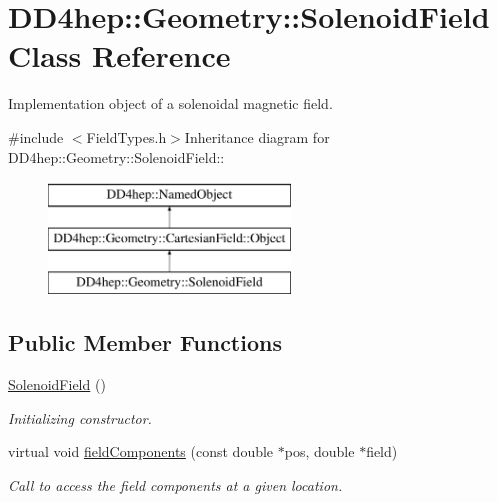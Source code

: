 \hypertarget{class_d_d4hep_1_1_geometry_1_1_solenoid_field}{
\section{DD4hep::Geometry::SolenoidField Class Reference}
\label{class_d_d4hep_1_1_geometry_1_1_solenoid_field}
}


Implementation object of a solenoidal magnetic field.  


{\ttfamily \#include $<$FieldTypes.h$>$}Inheritance diagram for DD4hep::Geometry::SolenoidField::\begin{figure}[H]
\begin{center}
\leavevmode
\includegraphics[height=3cm]{class_d_d4hep_1_1_geometry_1_1_solenoid_field}
\end{center}
\end{figure}
\subsection*{Public Member Functions}
\begin{DoxyCompactItemize}
\item 
\hyperlink{class_d_d4hep_1_1_geometry_1_1_solenoid_field_a882732fe549f63858d40cca4c5133bf9}{SolenoidField} ()
\begin{DoxyCompactList}\small\item\em Initializing constructor. \item\end{DoxyCompactList}\item 
virtual void \hyperlink{class_d_d4hep_1_1_geometry_1_1_solenoid_field_aef35ec6873e2227025d3b770bdbdc1e1}{fieldComponents} (const double $\ast$pos, double $\ast$field)
\begin{DoxyCompactList}\small\item\em Call to access the field components at a given location. \item\end{DoxyCompactList}\end{DoxyCompactItemize}
